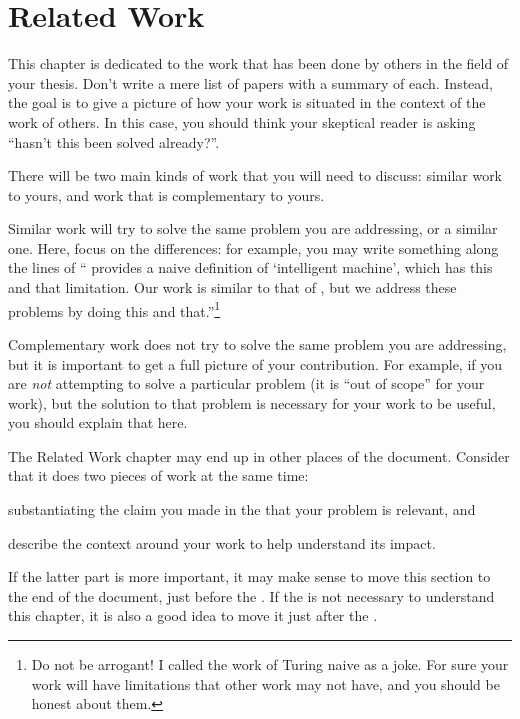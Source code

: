 \chapter{Related Work}
\label{ch:related}

This chapter is dedicated to the work that has been done by others in the field of your thesis.
Don't write a mere list of papers with a summary of each. Instead, the goal is to give a picture
of how your work is situated in the context of the work of others. In this case, you should
think your skeptical reader is asking ``hasn't this been solved already?''.

There will be two main kinds of work that you will need to discuss: similar work
to yours, and work that is complementary to yours.

Similar work will try to solve the same problem you are addressing, or a similar one.
Here, focus on the differences: for example, you may write something along the
lines of ``\textcite{DBLP:journals/x/Turing50} provides a naive definition of
`intelligent machine', which has this and that limitation. Our work is similar to that of
\citeauthor{DBLP:journals/x/Turing50}, but we address these problems by doing this and
that.''\footnote{Do not be arrogant! I called the work of Turing naive as a joke.
For sure your work will have limitations that other work may not have, and you should be honest about them.}

Complementary work does not try to solve the same problem you are addressing, but it is
important to get a full picture of your contribution. For example, if you are
\emph{not} attempting to solve a particular problem (it is ``out of scope'' for your work),
but the solution to that problem is necessary for your work to be useful, you should explain
that here.

The Related Work chapter may end up in other places of the document.
Consider that it does two pieces of work at the same time:
\begin{inparaenum}[\it (i)]
    \item substantiating the claim you made in the  that your problem is relevant, and
    \item describe the context around your work to help understand its impact.
\end{inparaenum}
If the latter part is more important, it may make sense to move this section to the end of the document, just before the .
If the  is not necessary to understand this chapter, it is also a good idea to move it just after the .

